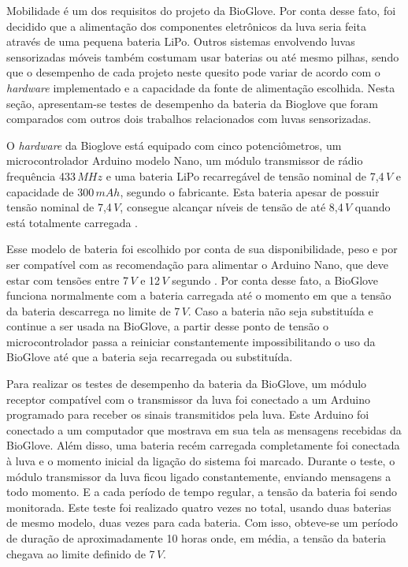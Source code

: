 \documentclass[
	12pt,				%
	openright,			%
	oneside,			%
	a4paper,			%
	english,			%
	brazil				%
	]{abntex2}
\begin{document}
			Mobilidade é um dos requisitos do projeto da BioGlove. Por conta desse fato, foi decidido que a alimentação dos componentes eletrônicos da luva seria feita através de uma pequena bateria LiPo. Outros sistemas envolvendo luvas sensorizadas móveis também costumam usar baterias ou até mesmo pilhas, sendo que o desempenho de cada projeto neste quesito pode variar de acordo com o \textit{hardware} implementado e a capacidade da fonte de alimentação escolhida. Nesta seção, apresentam-se testes de desempenho da bateria da Bioglove que foram comparados com outros dois trabalhos relacionados com luvas sensorizadas.

			O \textit{hardware} da Bioglove está equipado com cinco potenciômetros, um microcontrolador Arduino modelo Nano, um módulo transmissor de rádio frequência 433$\,MHz$ e uma bateria LiPo recarregável de tensão nominal de 7,4$\,V$ e capacidade de 300$\,mAh$, segundo o fabricante. Esta bateria apesar de possuir tensão nominal de 7,4$\,V$, consegue alcançar níveis de tensão de até 8,4$\,V$ quando está totalmente carregada \cite{buchmann2016batteries}.

			Esse modelo de bateria foi escolhido por conta de sua disponibilidade, peso e por ser compatível com as recomendação para alimentar o Arduino Nano, que deve estar com tensões entre 7$\,V$ e 12$\,V$ segundo \cite{arduinopowerrange}. Por conta desse fato, a BioGlove funciona normalmente com a bateria carregada até o momento em que a tensão da bateria descarrega no limite de 7$\,V$. Caso a bateria não seja substituída e continue a ser usada na BioGlove, a partir desse ponto de tensão o microcontrolador passa a reiniciar constantemente impossibilitando o uso da BioGlove até que a bateria seja recarregada ou substituída.

			Para realizar os testes de desempenho da bateria da BioGlove, um módulo receptor compatível com o transmissor da luva foi conectado a um Arduino programado para receber os sinais transmitidos pela luva. Este Arduino foi conectado a um computador que mostrava em sua tela as mensagens recebidas da BioGlove. Além disso, uma bateria recém carregada completamente foi conectada à luva e o momento inicial da ligação do sistema foi marcado. Durante o teste, o módulo transmissor da luva ficou ligado constantemente, enviando mensagens a todo momento. E a cada período de tempo regular, a tensão da bateria foi sendo monitorada. Este teste foi realizado quatro vezes no total, usando duas baterias de mesmo modelo, duas vezes para cada bateria. Com isso, obteve-se um período de duração de aproximadamente 10 horas onde, em média, a tensão da bateria chegava ao limite definido de 7$\,V$.
\end{document}
